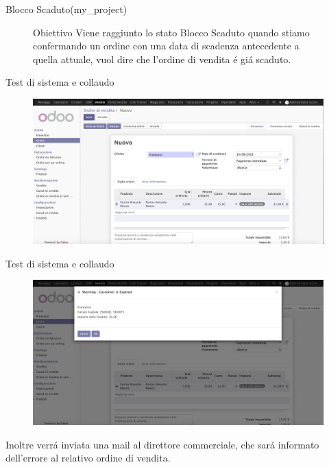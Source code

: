 \documentclass{beamer}
\begin{document}
\begin{frame}{Blocco Scaduto\scriptsize{(my\_project)}}
\begin{figure}[H]
	\begin{alertblock}{Obiettivo}
		 Viene raggiunto lo stato Blocco Scaduto quando stiamo confermando un ordine con una data di scadenza antecedente a quella attuale, vuol dire che l’ordine di vendita \'e gi\'a scaduto.
	\end{alertblock}	
\end{figure}

\end{frame}

\begin{frame}{Test di sistema e collaudo}

\begin{figure}[H]
	\begin{center} \includegraphics[width=1\linewidth]{figures/exp_one}
	\end{center}
\end{figure}

\end{frame}

\begin{frame}{Test di sistema e collaudo}

\begin{figure}[H]
	\begin{center} \includegraphics[width=0.95\linewidth]{figures/exp_two}
	\end{center}
\end{figure}

Inoltre verr\'a inviata una mail al direttore commerciale, che sar\'a informato dell'errore al relativo ordine di vendita.
\end{frame}
\end{document}

